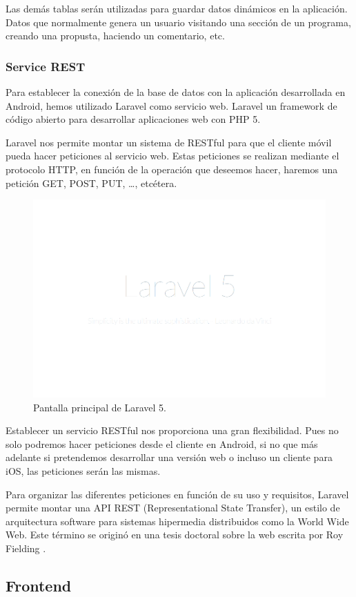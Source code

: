 Las demás tablas serán utilizadas para guardar datos dinámicos en la aplicación. Datos que normalmente genera un usuario visitando una sección de un programa, creando una propusta, haciendo un comentario, etc.

\subsubsection{Service REST}\label{sssec:rest}

Para establecer la conexión de la base de datos con la aplicación desarrollada en Android, hemos utilizado Laravel como servicio web. Laravel \cite{ref:laravel}  un framework de código abierto para desarrollar aplicaciones web con PHP 5.

Laravel nos permite montar un sistema de RESTful para que el cliente móvil pueda hacer peticiones al servicio web. Estas peticiones se realizan mediante el protocolo HTTP, en función de la operación que deseemos hacer, haremos una petición GET, POST, PUT, …, etcétera.

\begin{figure}[H]
\centering
\includegraphics[keepaspectratio, scale=0.30]{Media/Captures/laravel5.png}
\caption{Pantalla principal de Laravel 5.}
\label{fig:laravel5}
\end{figure}

Establecer un servicio RESTful nos proporciona una gran flexibilidad. Pues no solo podremos hacer peticiones desde el cliente en Android, si no que más adelante si pretendemos desarrollar una versión web o incluso un cliente para iOS, las peticiones serán las mismas.

Para organizar las diferentes peticiones en función de su uso y requisitos, Laravel permite montar una API REST (Representational State Transfer), un estilo de arquitectura software para sistemas hipermedia distribuidos como la World Wide Web. Este término se originó en una tesis doctoral sobre la web escrita por Roy Fielding \cite{ref:RESTPhd}.

\subsection{Frontend}